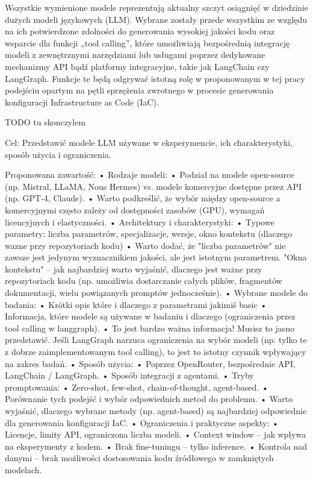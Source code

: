 Wszystkie wymienione modele reprezentują aktualny szczyt osiągnięć w dziedzinie dużych modeli językowych (LLM). Wybrane zostały przede wszystkim ze względu na ich potwierdzone zdolności do generowania wysokiej jakości kodu oraz wsparcie dla funkcji „tool calling”, które umożliwiają bezpośrednią integrację modeli z zewnętrznymi narzędziami lub usługami poprzez dedykowane mechanizmy API bądź platformy integracyjne, takie jak LangChain czy LangGraph. Funkcje te będą odgrywać istotną rolę w proponowanym w tej pracy podejściu opartym na pętli sprzężenia zwrotnego w procesie generowania konfiguracji Infrastructure as Code (IaC).

TODO tu skonczylem

Cel: Przedstawić modele LLM używane w eksperymencie, ich charakterystyki, sposób użycia i ograniczenia.

Proponowana zawartość:
	•	Rodzaje modeli:
	•	    Podział na modele open-source (np. Mistral, LLaMA, Nous Hermes) vs. modele komercyjne dostępne przez API (np. GPT-4, Claude).
	•		Warto podkreślić, że wybór między open-source a komercyjnymi często zależy od dostępności zasobów (GPU), wymagań licencyjnych i elastyczności.
	•	Architektury i charakterystyki:
	•	    Typowe parametry: liczba parametrów, specjalizacje, wersje, okno kontekstu (dlaczego wazne przy repozytoriach kodu)
	•		Warto dodać, że "liczba parametrów" nie zawsze jest jedynym wyznacznikiem jakości, ale jest istotnym parametrem. "Okna kontekstu" – jak najbardziej warto wyjaśnić, dlaczego jest ważne przy repozytoriach kodu (np. umożliwia dostarczanie całych plików, fragmentów dokumentacji, wielu powiązanych promptów jednocześnie).
    •   Wybrane modele do badania:
    •       Krótki opis które i dlaczego z parametrami jakimiś basic
	• 		Informacja, które modele są używane w badaniu i dlaczego (ograniczenia przez tool calling w langgraph).
	•		To jest bardzo ważna informacja! Musisz to jasno przedstawić. Jeśli LangGraph narzuca ograniczenia na wybór modeli (np. tylko te z dobrze zaimplementowanym tool calling), to jest to istotny czynnik wpływający na zakres badań.
	•	Sposób użycia:
	•	    Poprzez OpenRouter, bezpośrednie API, LangChain / LangGraph.
	•	    Sposób integracji z agentami.
	•	Tryby promptowania:
	•	    Zero-shot, few-shot, chain-of-thought, agent-based.
	•	    Porównanie tych podejść i wybór odpowiednich metod do problemu.
	•		Warto wyjaśnić, dlaczego wybrane metody (np. agent-based) są najbardziej odpowiednie dla generowania konfiguracji IaC.
	•	Ograniczenia i praktyczne aspekty:
	•	    Licencje, limity API, ograniczona liczba modeli.
	•	    Context window – jak wpływa na eksperymenty z kodem.
	•	    Brak fine-tuningu – tylko inference.
	•	    Kontrola nad danymi – brak możliwości dostosowania kodu źródłowego w zamkniętych modelach.



